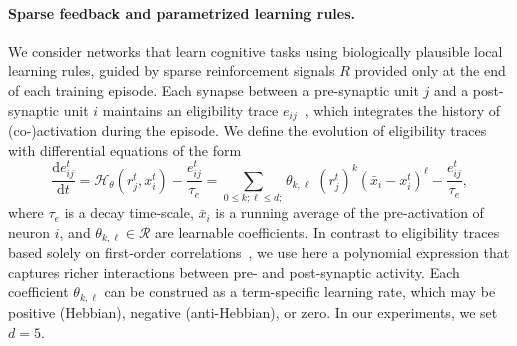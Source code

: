 \documentclass[mlabstract]{jmlr}
\newcommand{\de}{\text{d}}
\begin{document}
\paragraph{Sparse feedback and parametrized learning rules.} We consider networks that learn cognitive tasks using biologically plausible local learning rules, guided by sparse reinforcement signals $R$ provided only at the end of each training episode.
Each synapse between a pre-synaptic unit $j$ and a post-synaptic unit $i$ maintains an eligibility trace $e_{ij}$~\citep{izhikevich2007solving}, which integrates the history of (co-)activation during the episode. We define the evolution of eligibility traces with differential equations of the form
\begin{equation}\label{eq:eligi}
\frac{\de e^t_{ij}}{\de t} = \mathcal{H}_\theta( r^t_j, x^t_i) - \frac{e^t_{ij}}{\tau_e}= \sum_{0\leq k;\ell\leq d;}{ \theta_{k,\ell} \; \left(r^t_j\right)^k  \left(\bar{x}_i - x^t_i\right)^\ell  } - \frac{e^t_{ij}}{\tau_e}, 
\end{equation}
where $\tau_e$ is a decay time-scale, $\bar{x}_i$ is a running average of the pre-activation of neuron $i$, and $\theta_{k,\ell} \in \mathcal{R}$ are learnable coefficients.
In contrast to eligibility traces based solely on first-order correlations~\citep{gerstner2018eligibility}, we use here a polynomial expression that captures richer interactions between pre- and post-synaptic activity.
Each coefficient $\theta_{k,\ell}$ can be construed as a term-specific learning rate, which may be positive (Hebbian), negative (anti-Hebbian), or zero. 
In our experiments, we set $d = 5$.
\end{document}
